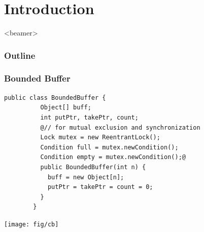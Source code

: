 \documentclass[mathserif,14pt,xcolor=table]{beamer}
\begin{document}
\section{Introduction}

    \begin{frame}<beamer>
        \frametitle{Outline}
        \tableofcontents[
            currentsubsection,
        ]
    \end{frame}
%    

\begin{frame}[fragile]
    \frametitle{Bounded Buffer}
    \begin{lstlisting}[style=base]
        public class BoundedBuffer {
          Object[] buff;
          int putPtr, takePtr, count;
          @// for mutual exclusion and synchronization 
          Lock mutex = new ReentrantLock();
          Condition full = mutex.newCondition();
          Condition empty = mutex.newCondition();@
          public BoundedBuffer(int n) {
            buff = new Object[n];
            putPtr = takePtr = count = 0;
          }
        }
    \end{lstlisting}
    {\hfill \texttt{[image: fig/cb]}}
\end{frame}
\end{document}
